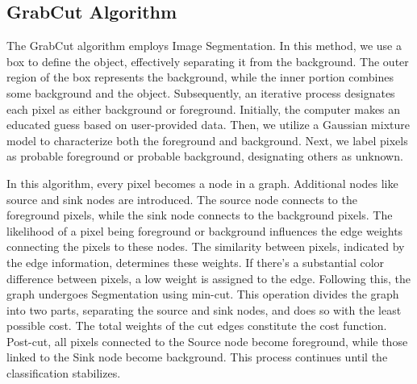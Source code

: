 \documentclass[12pt, a4paper, twoside]{article}
\begin{document}
	\subsection{GrabCut Algorithm}
	The GrabCut algorithm\cite{grabcut} employs Image Segmentation. In this method, we use a box to define the object, effectively separating it from the background. The outer region of the box represents the background, while the inner portion combines some background and the object. Subsequently, an iterative process designates each pixel as either background or foreground. Initially, the computer makes an educated guess based on user-provided data. Then, we utilize a Gaussian mixture model to characterize both the foreground and background. Next, we label pixels as probable foreground or probable background, designating others as unknown.
	\par
	In this algorithm, every pixel becomes a node in a graph. Additional nodes like source and sink nodes are introduced. The source node connects to the foreground pixels, while the sink node connects to the background pixels. The likelihood of a pixel being foreground or background influences the edge weights connecting the pixels to these nodes. The similarity between pixels, indicated by the edge information, determines these weights. If there's a substantial color difference between pixels, a low weight is assigned to the edge. Following this, the graph undergoes Segmentation using min-cut. This operation divides the graph into two parts, separating the source and sink nodes, and does so with the least possible cost. The total weights of the cut edges constitute the cost function. Post-cut, all pixels connected to the Source node become foreground, while those linked to the Sink node become background. This process continues until the classification stabilizes.
	
\end{document}
